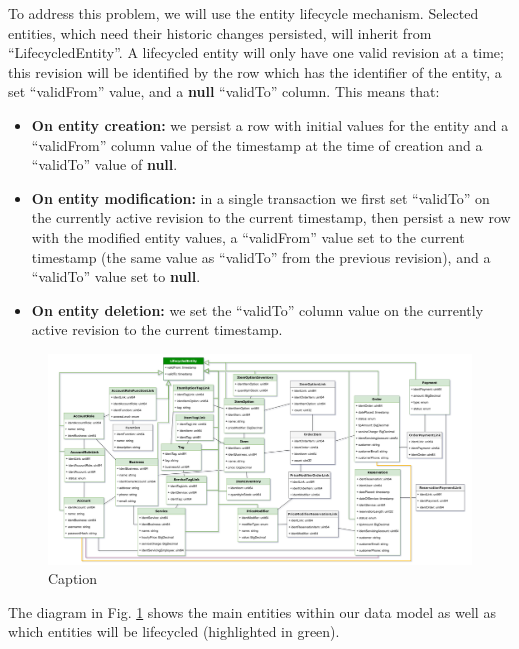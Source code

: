 \documentclass[11pt,a4paper,pdftex]{article}
\begin{document}
To address this problem, we will use the entity lifecycle mechanism. Selected entities, which need their historic changes persisted, will inherit from \enquote{LifecycledEntity}. A lifecycled entity will only have one valid revision at a time; this revision will be identified by the row which has the identifier of the entity, a set \enquote{validFrom} value, and a \textbf{null} \enquote{validTo} column. This means that:
\begin{itemize}
    \item \textbf{On entity creation:} we persist a row with initial values for the entity and a \enquote{validFrom} column value of the timestamp at the time of creation and a \enquote{validTo} value of \textbf{null}.
    \item \textbf{On entity modification:} in a single transaction we first set \enquote{validTo} on the currently active revision to the current timestamp, then persist a new row with the modified entity values, a \enquote{validFrom} value set to the current timestamp (the same value as \enquote{validTo} from the previous revision), and a \enquote{validTo} value set to \textbf{null}.
    \item \textbf{On entity deletion:} we set the \enquote{validTo} column value on the currently active revision to the current timestamp.
\end{itemize}

\begin{figure}[H]
    \centering
    \includegraphics[width=1\linewidth]{data_model.drawio.pdf}
    \caption{Caption}
    \label{fig:data_model}
\end{figure}

The diagram in Fig. \ref{fig:data_model} shows the main entities within our data model as well as which entities will be lifecycled (highlighted in green).
\end{document}
